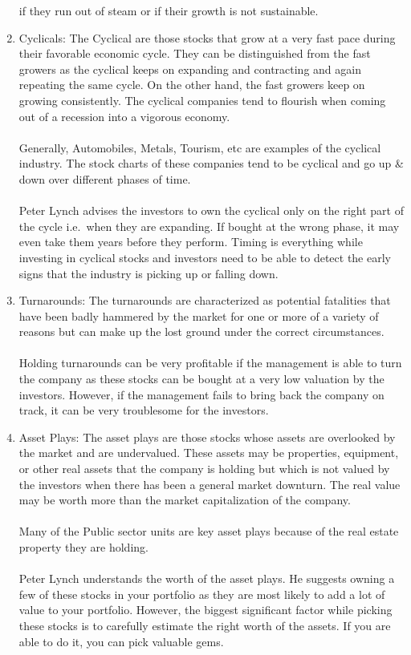 \begin{enumerate}
        if they run out of steam or if their growth is not sustainable.
    \item Cyclicals: The Cyclical are those stocks that grow at a very fast pace 
        during their favorable economic cycle. They can be distinguished from the 
        fast growers as the cyclical keeps on expanding and contracting and again 
        repeating the same cycle. On the other hand, the fast growers keep on 
        growing consistently. The cyclical companies tend to flourish when coming 
        out of a recession into a vigorous economy.\\\\
        Generally, Automobiles, Metals, Tourism, etc are examples of the cyclical 
        industry. The stock charts of these companies tend to be cyclical and go 
        up \& down over different phases of time.\\\\
        Peter Lynch advises the investors to own the cyclical only on the right 
        part of the cycle i.e.\ when they are expanding. If bought at the wrong 
        phase, it may even take them years before they perform. Timing is 
        everything while investing in cyclical stocks and investors need to be 
        able to detect the early signs that the industry is picking up or falling 
        down.
    \item Turnarounds: The turnarounds are characterized as potential fatalities 
        that have been badly hammered by the market for one or more of a variety 
        of reasons but can make up the lost ground under the correct circumstances.\\\\
        Holding turnarounds can be very profitable if the management is able to 
        turn the company as these stocks can be bought at a very low valuation 
        by the investors. However, if the management fails to bring back the 
        company on track, it can be very troublesome for the investors.
    \item Asset Plays: The asset plays are those stocks whose assets are 
        overlooked by the market and are undervalued. These assets may be 
        properties, equipment, or other real assets that the company is holding 
        but which is not valued by the investors when there has been a general 
        market downturn. The real value may be worth more than the market 
        capitalization of the company.\\\\
        Many of the Public sector units are key asset plays because of the real 
        estate property they are holding.\\\\
        Peter Lynch understands the worth of the asset plays. He suggests owning 
        a few of these stocks in your portfolio as they are most likely to add a 
        lot of value to your portfolio. However, the biggest significant factor 
        while picking these stocks is to carefully estimate the right worth of 
        the assets. If you are able to do it, you can pick valuable gems.
\end{enumerate}

